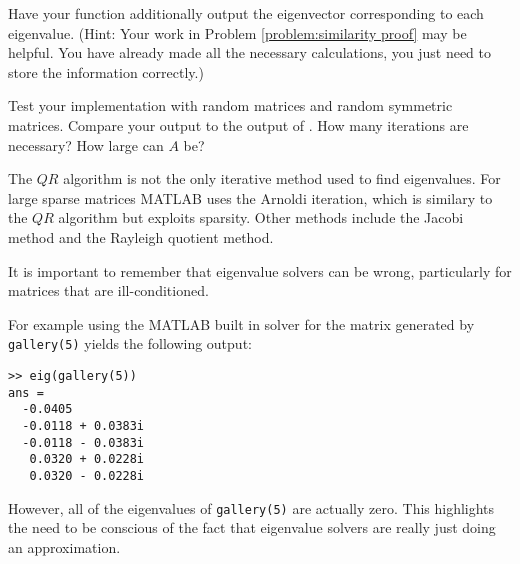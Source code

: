 \begin{problem}
Have your function additionally output the eigenvector corresponding to each eigenvalue. (Hint: Your work in Problem \ref{problem:similarity proof} may be helpful. You have already made all the necessary calculations, you just need to store the information correctly.)
\end{problem}

\begin{problem}
Test your implementation with random matrices and random symmetric matrices. Compare your output to the output of . How many iterations are necessary? How large can $A$ be?
\end{problem}

The $QR$ algorithm is not the only iterative method used to find eigenvalues. For large sparse matrices MATLAB uses the Arnoldi iteration, which is similary to the $QR$ algorithm but exploits sparsity. Other methods include the Jacobi method and the Rayleigh quotient method.

It is important to remember that eigenvalue solvers can be wrong, particularly for matrices that are ill-conditioned. 
\begin{matlab}
For example using the MATLAB built in solver for the matrix generated by {\tt gallery(5)} yields the following output:
\begin{lstlisting}[style=matlab]
>> eig(gallery(5))
ans =
  -0.0405          
  -0.0118 + 0.0383i
  -0.0118 - 0.0383i
   0.0320 + 0.0228i
   0.0320 - 0.0228i
\end{lstlisting}

However, all of the eigenvalues of {\tt gallery(5)} are actually zero. This highlights the need to be conscious of the fact that eigenvalue solvers are really just doing an approximation.
\end{matlab}

